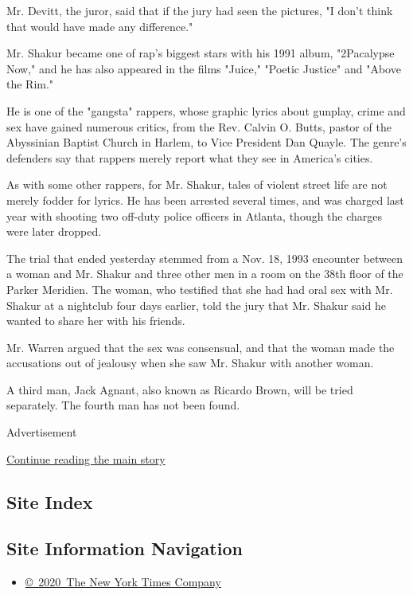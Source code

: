 Mr. Devitt, the juror, said that if the jury had seen the pictures, "I
don't think that would have made any difference."

Mr. Shakur became one of rap's biggest stars with his 1991 album,
"2Pacalypse Now," and he has also appeared in the films "Juice," "Poetic
Justice" and "Above the Rim."

He is one of the "gangsta" rappers, whose graphic lyrics about gunplay,
crime and sex have gained numerous critics, from the Rev. Calvin O.
Butts, pastor of the Abyssinian Baptist Church in Harlem, to Vice
President Dan Quayle. The genre's defenders say that rappers merely
report what they see in America's cities.

As with some other rappers, for Mr. Shakur, tales of violent street life
are not merely fodder for lyrics. He has been arrested several times,
and was charged last year with shooting two off-duty police officers in
Atlanta, though the charges were later dropped.

The trial that ended yesterday stemmed from a Nov. 18, 1993 encounter
between a woman and Mr. Shakur and three other men in a room on the 38th
floor of the Parker Meridien. The woman, who testified that she had had
oral sex with Mr. Shakur at a nightclub four days earlier, told the jury
that Mr. Shakur said he wanted to share her with his friends.

Mr. Warren argued that the sex was consensual, and that the woman made
the accusations out of jealousy when she saw Mr. Shakur with another
woman.

A third man, Jack Agnant, also known as Ricardo Brown, will be tried
separately. The fourth man has not been found.

Advertisement

\protect\hyperlink{after-bottom}{Continue reading the main story}

\hypertarget{site-index}{%
\subsection{Site Index}\label{site-index}}

\hypertarget{site-information-navigation}{%
\subsection{Site Information
Navigation}\label{site-information-navigation}}

\begin{itemize}
\tightlist
\item
  \href{https://help.nytimes3xbfgragh.onion/hc/en-us/articles/115014792127-Copyright-notice}{©~2020~The
  New York Times Company}
\end{itemize}

